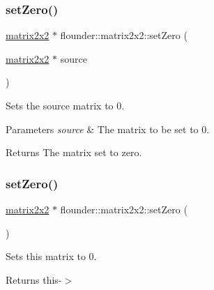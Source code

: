\subsubsection{\texorpdfstring{set\+Zero()}{setZero()}\hspace{0.1cm}{\footnotesize\ttfamily [1/2]}}
{\footnotesize\ttfamily \hyperlink{classflounder_1_1matrix2x2}{matrix2x2} $\ast$ flounder\+::matrix2x2\+::set\+Zero (\begin{DoxyParamCaption}\item[{\hyperlink{classflounder_1_1matrix2x2}{matrix2x2} $\ast$}]{source }\end{DoxyParamCaption})\hspace{0.3cm}{\ttfamily [static]}}



Sets the source matrix to 0. 


\begin{DoxyParams}{Parameters}
{\em source} & The matrix to be set to 0. \\
\hline
\end{DoxyParams}
\begin{DoxyReturn}{Returns}
The matrix set to zero. 
\end{DoxyReturn}
\mbox{\label{classflounder_1_1matrix2x2_aca923ffc8b695dc00d974860691e89d9}} 
\subsubsection{\texorpdfstring{set\+Zero()}{setZero()}\hspace{0.1cm}{\footnotesize\ttfamily [2/2]}}
{\footnotesize\ttfamily \hyperlink{classflounder_1_1matrix2x2}{matrix2x2} $\ast$ flounder\+::matrix2x2\+::set\+Zero (\begin{DoxyParamCaption}{ }\end{DoxyParamCaption})}



Sets this matrix to 0. 

\begin{DoxyReturn}{Returns}
this-\/$>$ 
\end{DoxyReturn}
\mbox{\label{classflounder_1_1matrix2x2_a5372cabfb954d05ed9120e949b972b0a}} 
